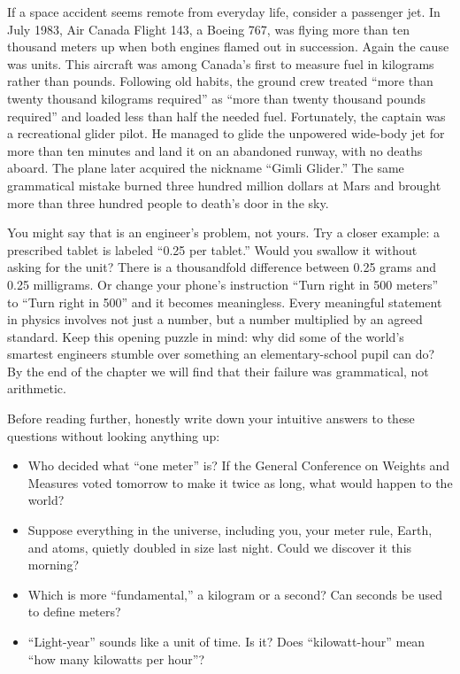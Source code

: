 If a space accident seems remote from everyday life, consider a passenger jet. In July 1983, Air Canada Flight 143, a Boeing 767, was flying more than ten thousand meters up when both engines flamed out in succession. Again the cause was units. This aircraft was among Canada's first to measure fuel in kilograms rather than pounds. Following old habits, the ground crew treated ``more than twenty thousand kilograms required'' as ``more than twenty thousand pounds required'' and loaded less than half the needed fuel. Fortunately, the captain was a recreational glider pilot. He managed to glide the unpowered wide-body jet for more than ten minutes and land it on an abandoned runway, with no deaths aboard. The plane later acquired the nickname ``Gimli Glider.'' The same grammatical mistake burned three hundred million dollars at Mars and brought more than three hundred people to death's door in the sky.

You might say that is an engineer's problem, not yours. Try a closer example: a prescribed tablet is labeled ``0.25 per tablet.'' Would you swallow it without asking for the unit? There is a thousandfold difference between 0.25 grams and 0.25 milligrams. Or change your phone's instruction ``Turn right in 500 meters'' to ``Turn right in 500'' and it becomes meaningless. Every meaningful statement in physics involves not just a number, but a number multiplied by an agreed standard. Keep this opening puzzle in mind: why did some of the world's smartest engineers stumble over something an elementary-school pupil can do? By the end of the chapter we will find that their failure was grammatical, not arithmetic.


Before reading further, honestly write down your intuitive answers to these questions without looking anything up:

\begin{itemize}[leftmargin=1.8em]
  \item Who decided what ``one meter'' is? If the General Conference on Weights and Measures voted tomorrow to make it twice as long, what would happen to the world?
  \item Suppose everything in the universe, including you, your meter rule, Earth, and atoms, quietly doubled in size last night. Could we discover it this morning?
  \item Which is more ``fundamental,'' a kilogram or a second? Can seconds be used to define meters?
  \item ``Light-year'' sounds like a unit of time. Is it? Does ``kilowatt-hour'' mean ``how many kilowatts per hour''?
\end{itemize}

